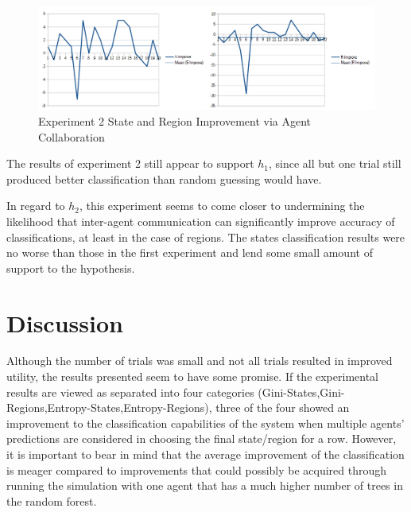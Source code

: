 \documentclass{article}
\begin{document}
\begin{figure}[H]
	\includegraphics[width=\textwidth]{e2_improvement}
	\caption{Experiment 2 State and Region Improvement via Agent Collaboration}
\end{figure}



\par The results of experiment 2 still appear to support $h_{1}$, since all but one trial still produced better classification than random guessing would have.
\par In regard to $h_{2}$, this experiment seems to come closer to undermining the likelihood that inter-agent communication can significantly improve accuracy of classifications, at least in the case of regions. The states classification results were no worse than those in the first experiment and lend some small amount of support to the hypothesis.




\section{Discussion}


\par Although the number of trials was small and not all trials resulted in improved utility, the results presented seem to have some promise. If the experimental results are viewed as separated into four categories (Gini-States,Gini-Regions,Entropy-States,Entropy-Regions), three of the four showed an improvement to the classification capabilities of the system when multiple agents' predictions are considered in choosing the final state/region for a row. However, it is important to bear in mind that the average improvement of the classification is meager compared to improvements that could possibly be acquired through running the simulation with one agent that has a much higher number of trees in the random forest.
\end{document}
